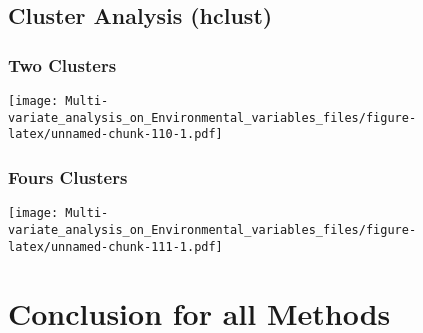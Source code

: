 \documentclass[]{book}
\begin{document}
\hypertarget{cluster-analysis-hclust}{%
\section{Cluster Analysis (hclust)}\label{cluster-analysis-hclust}}

\hypertarget{two-clusters}{%
\subsection{Two Clusters}\label{two-clusters}}

\texttt{[image: Multi-variate\_analysis\_on\_Environmental\_variables\_files/figure-latex/unnamed-chunk-110-1.pdf]}

\hypertarget{fours-clusters}{%
\subsection{Fours Clusters}\label{fours-clusters}}

\texttt{[image: Multi-variate\_analysis\_on\_Environmental\_variables\_files/figure-latex/unnamed-chunk-111-1.pdf]}

\hypertarget{conclusion-for-all-methods}{%
\chapter{Conclusion for all Methods}\label{conclusion-for-all-methods}}
\end{document}

